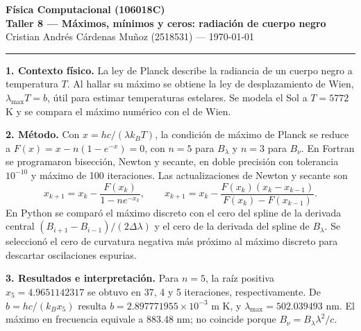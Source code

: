 \documentclass[11pt,a4paper]{article}
\begin{document}
\begin{center}
{\large\bfseries Física Computacional (106018C)}\\
{\bfseries Taller 8 --- Máximos, mínimos y ceros: radiación de cuerpo negro}\\
Cristian Andrés Cárdenas Muñoz (2518531) --- \today
\end{center}
\hrule\vspace{4pt}

\textbf{1. Contexto físico.}
La ley de Planck describe la radiancia de un cuerpo negro a temperatura $T$.
Al hallar su máximo se obtiene la ley de desplazamiento de Wien,
$\lambda_{\max}T=b$, útil para estimar temperaturas estelares.
Se modela el Sol a $T=5772$ K y se compara el máximo numérico con el de Wien.

\textbf{2. Método.}
Con $x=hc/(\lambda k_BT)$, la condición de máximo de Planck se reduce a
$F(x)=x-n(1-e^{-x})=0$, con $n=5$ para $B_\lambda$ y $n=3$ para $B_\nu$.
En Fortran se programaron bisección, Newton y secante, en doble precisión
con tolerancia $10^{-10}$ y máximo de 100 iteraciones. Las actualizaciones de Newton y secante son
\[
 x_{k+1}=x_k-\frac{F(x_k)}{1-ne^{-x_k}},
 \qquad
 x_{k+1}=x_k-\frac{F(x_k)(x_k-x_{k-1})}{F(x_k)-F(x_{k-1})}.
\]
En Python se comparó el máximo discreto con el cero del spline de la derivada central
$(B_{i+1}-B_{i-1})/(2\Delta\lambda)$ y el cero de la derivada del spline de $B_\lambda$.
Se seleccionó el cero de curvatura negativa más próximo al máximo discreto para descartar oscilaciones espurias.

\textbf{3. Resultados e interpretación.}
Para $n=5$, la raíz positiva $x_5=4.9651142317$ se obtuvo en 37, 4 y 5 iteraciones,
respectivamente. De $b=hc/(k_Bx_5)$ resulta $b=2.897771955\times10^{-3}$ m K,
y $\lambda_{\max}=502.039493$ nm. El máximo en frecuencia equivale a 883.48 nm;
no coincide porque $B_\nu=B_\lambda\lambda^2/c$.
\end{document}
